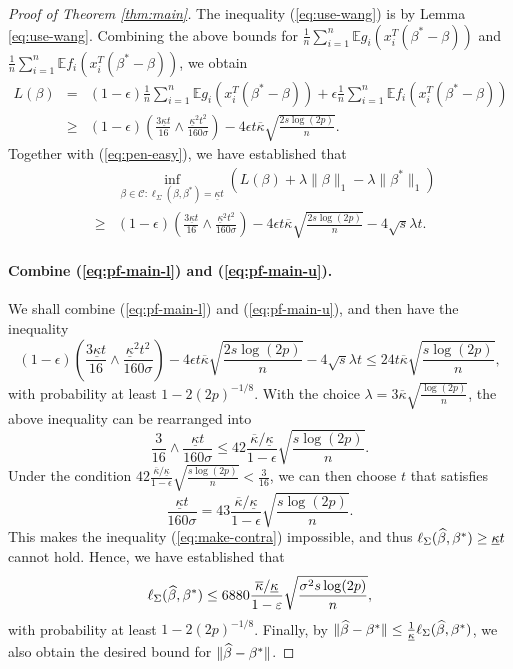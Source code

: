 \begin{proof}[Proof of Theorem \ref{thm:main}]
The inequality (\ref{eq:use-wang}) is by Lemma \ref{eq:use-wang}.
Combining the above bounds for $\frac{1}{n}\sum_{i=1}^n\mathbb{E}g_i(x_i^T(\beta^*-\beta))$ and $\frac{1}{n}\sum_{i=1}^n\mathbb{E}f_i(x_i^T(\beta^*-\beta))$, we obtain
\begin{eqnarray*}
L(\beta) &=& (1-\epsilon)\frac{1}{n}\sum_{i=1}^n\mathbb{E}g_i(x_i^T(\beta^*-\beta)) + \epsilon \frac{1}{n}\sum_{i=1}^n\mathbb{E}f_i(x_i^T(\beta^*-\beta)) \\
&\geq& (1-\epsilon)\left(\frac{3\underline{\kappa}t}{16}\wedge\frac{\underline{\kappa}^2t^2}{160\sigma}\right) -4\epsilon t\overline{\kappa}\sqrt{\frac{2s\log(2p)}{n}}.
\end{eqnarray*}
Together with (\ref{eq:pen-easy}), we have established that
\begin{eqnarray}
\nonumber && \inf_{\beta\in\mathcal{C}:\ell_{\Sigma}(\beta,\beta^*)=\underline{\kappa}t}(L(\beta)+\lambda\|\beta\|_1-\lambda\|\beta^*\|_1) \\
\label{eq:pf-main-u} &\geq& (1-\epsilon)\left(\frac{3\underline{\kappa}t}{16}\wedge\frac{\underline{\kappa}^2t^2}{160\sigma}\right) -4\epsilon t\overline{\kappa}\sqrt{\frac{2s\log(2p)}{n}} -4\sqrt{s}\lambda t.
\end{eqnarray}

\paragraph{Combine (\ref{eq:pf-main-l}) and (\ref{eq:pf-main-u}).} We shall combine (\ref{eq:pf-main-l}) and (\ref{eq:pf-main-u}), and then have the inequality
$$(1-\epsilon)\left(\frac{3\underline{\kappa}t}{16}\wedge\frac{\underline{\kappa}^2t^2}{160\sigma}\right) -4\epsilon t\overline{\kappa}\sqrt{\frac{2s\log(2p)}{n}} -4\sqrt{s}\lambda t\leq 24t\overline{\kappa}\sqrt{\frac{s\log (2p)}{n}},$$
with probability at least $1-2(2p)^{-1/8}$. With the choice $\lambda=3\overline{\kappa}\sqrt{\frac{\log(2p)}{n}}$, the above inequality can be rearranged into
\begin{equation}
\frac{3}{16}\wedge\frac{\underline{\kappa}t}{160\sigma}\leq 42\frac{\overline{\kappa}/\underline{\kappa}}{1-\epsilon}\sqrt{\frac{s\log(2p)}{n}}. \label{eq:make-contra}
\end{equation}
Under the condition $42\frac{\overline{\kappa}/\underline{\kappa}}{1-\epsilon}\sqrt{\frac{s\log(2p)}{n}}<\frac{3}{16}$, we can then choose $t$ that satisfies
$$\frac{\underline{\kappa}t}{160\sigma}=43\frac{\overline{\kappa}/\underline{\kappa}}{1-\epsilon}\sqrt{\frac{s\log(2p)}{n}}.$$
This makes the inequality (\ref{eq:make-contra}) impossible, and thus $\ell_{\Sigma}(\widehat{\beta},\beta^*)\geq \underline{\kappa}t$ cannot hold. Hence, we have established that
$$\ell_{\Sigma}(\widehat{\beta},\beta^*)\leq 6880 \frac{\overline{\kappa}/\underline{\kappa}}{1-\varepsilon}\sqrt{\frac{\sigma^2s\log(2p)}{n}},$$
with probability at least $1-2(2p)^{-1/8}$. Finally, by $\|\widehat{\beta}-\beta^*\|\leq \frac{1}{\underline{\kappa}}\ell_{\Sigma}(\widehat{\beta},\beta^*)$, we also obtain the desired bound for $\|\widehat{\beta}-\beta^*\|$.
\end{proof}


